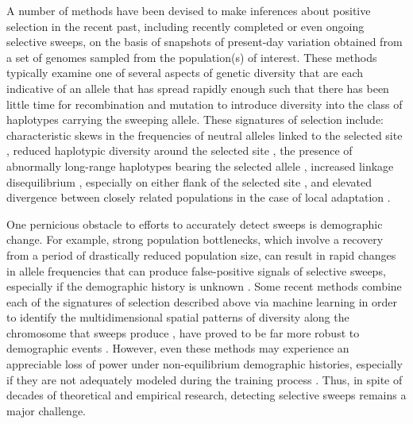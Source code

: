 A number of methods have been devised to make inferences about positive selection in the recent past, including recently completed or even ongoing selective sweeps, on the basis of snapshots of present-day variation obtained from a set of genomes sampled from the population(s) of interest. These methods typically examine one of several aspects of genetic diversity that are each indicative of an allele that has spread rapidly enough such that there has been little time for recombination and mutation to introduce diversity into the class of haplotypes carrying the sweeping allele. These signatures of selection include: characteristic skews in the frequencies of neutral alleles linked to the selected site \cite{fayHitchhikingPositiveDarwinian2000,kimDetectingLocalSignature2002,liNewTestDetecting2011}, reduced haplotypic diversity around the selected site \cite{garudRecentSelectiveSweeps2015,harrisLikelihoodApproachUncovering2020,hudsonEvidencePositiveSelection1994}, the presence of abnormally long-range haplotypes bearing the selected allele \cite{ferrer-admetllaDetectingIncompleteSoft2014,sabetiDetectingRecentPositive2002,voightMapRecentPositive2006}, increased linkage disequilibrium \cite{kellyTestNeutralityBased1997}, especially on either flank of the selected site \cite{kimLinkageDisequilibriumSignature2004}, and elevated divergence between closely related populations in the case of local adaptation \cite{chenPopulationDifferentiationTest2010}.

One pernicious obstacle to efforts to accurately detect sweeps is demographic change. For example, strong population bottlenecks, which involve a recovery from a period of drastically reduced population size, can result in rapid changes in allele frequencies that can produce false-positive signals of selective sweeps, especially if the demographic history is unknown \cite{jensenDistinguishingSelectiveSweeps2005,mughalLocalizingClassifyingAdaptive2019,nielsenGenomicScansSelective2005}. Some recent methods combine each of the signatures of selection described above via machine learning in order to identify the multidimensional spatial patterns of diversity along the chromosome that sweeps produce \cite{caldasInferenceSelectiveSweep2022,lauterburVersatileDetectionDiverse2022,linDistinguishingPositiveSelection2011,mughalLocalizingClassifyingAdaptive2019,pybusHierarchicalBoostingMachinelearning2015,sugdenLocalizationAdaptiveVariants2018,xueDiscoveryOngoingSelective2021}, have proved to be far more robust to demographic events \cite{mughalLocalizingClassifyingAdaptive2019,schriderHICRobustIdentification2016}. However, even these methods may experience an appreciable loss of power under non-equilibrium demographic histories, especially if they are not adequately modeled during the training process \cite{mughalLocalizingClassifyingAdaptive2019,schriderHICRobustIdentification2016}. Thus, in spite of decades of theoretical and empirical research, detecting selective sweeps remains a major challenge.

